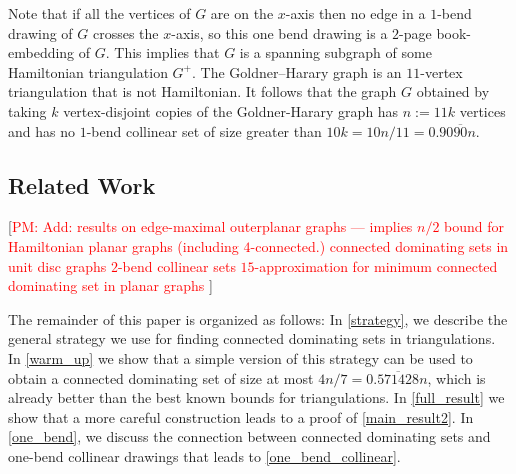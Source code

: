 \documentclass[12pt]{article}
\theoremstyle{definition}
\newcommand{\pat}[1]{[\textcolor{red}{PM: #1}]}
\begin{document}
Note that if all the vertices of $G$ are on the $x$-axis then no edge in a $1$-bend drawing of $G$ crosses the $x$-axis, so this one bend drawing is a $2$-page book-embedding of $G$. This implies that $G$ is a spanning subgraph of some Hamiltonian triangulation $G^+$.  The Goldner–Harary graph is an $11$-vertex triangulation that is not Hamiltonian. It follows that the graph $G$ obtained by taking $k$ vertex-disjoint copies of the Goldner-Harary graph has $n:=11k$ vertices and has no $1$-bend collinear set of size greater than $10k=10n/11=0.90\overline{90}n$.





\subsection{Related Work}

\pat{Add: \newline
results on edge-maximal outerplanar graphs --- implies $n/2$ bound for Hamiltonian planar graphs (including $4$-connected.) \newline
connected dominating sets in unit disc graphs \newline
$2$-bend collinear sets \newline
$15$-approximation for minimum connected dominating set in planar graphs \newline
}

The remainder of this paper is organized as follows:  In \cref{strategy}, we describe the general strategy we use for finding connected dominating sets in triangulations.  In \cref{warm_up} we show that a simple version of this strategy can be used to obtain a connected dominating set of size at most $4n/7= 0.\overline{571428}n$, which is already better than the best known bounds for triangulations.  In \cref{full_result} we show that a more careful construction leads to a proof of \cref{main_result2}.  In \cref{one_bend}, we discuss the connection between connected dominating sets and one-bend collinear drawings that leads to \cref{one_bend_collinear}.

%
\end{document}
